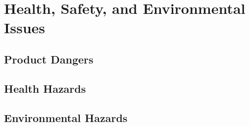 \section{Health, Safety, and Environmental Issues}

\subsection{Product Dangers}

\subsection{Health Hazards}

\subsection{Environmental Hazards}

